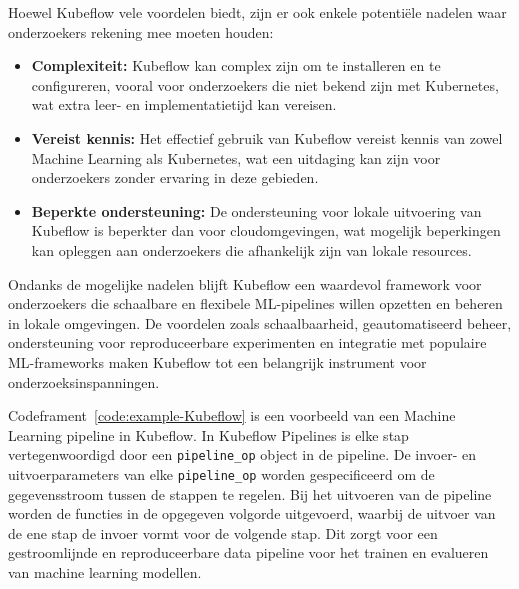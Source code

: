 Hoewel Kubeflow vele voordelen biedt, zijn er ook enkele potentiële nadelen waar onderzoekers rekening mee moeten houden:
\begin{itemize}
    \item \textbf{Complexiteit:} Kubeflow kan complex zijn om te installeren en te configureren, vooral voor onderzoekers die niet bekend zijn met Kubernetes, wat extra leer- en implementatietijd kan vereisen.
    \item \textbf{Vereist kennis:} Het effectief gebruik van Kubeflow vereist kennis van zowel Machine Learning als Kubernetes, wat een uitdaging kan zijn voor onderzoekers zonder ervaring in deze gebieden.
    \item \textbf{Beperkte ondersteuning:} De ondersteuning voor lokale uitvoering van Kubeflow is beperkter dan voor cloudomgevingen, wat mogelijk beperkingen kan opleggen aan onderzoekers die afhankelijk zijn van lokale resources.
\end{itemize}
Ondanks de mogelijke nadelen blijft Kubeflow een waardevol framework voor onderzoekers die schaalbare en flexibele ML-pipelines willen opzetten en beheren in lokale omgevingen. De voordelen zoals schaalbaarheid, geautomatiseerd beheer, ondersteuning voor reproduceerbare experimenten en integratie met populaire ML-frameworks maken Kubeflow tot een belangrijk instrument voor onderzoeksinspanningen.

Codeframent~\ref{code:example-Kubeflow} is een voorbeeld van een Machine Learning pipeline in Kubeflow. In Kubeflow Pipelines is elke stap vertegenwoordigd door een \texttt{pipeline\_op} object in de pipeline. De invoer- en uitvoerparameters van elke \texttt{pipeline\_op} worden gespecificeerd om de gegevensstroom tussen de stappen te regelen. Bij het uitvoeren van de pipeline worden de functies in de opgegeven volgorde uitgevoerd, waarbij de uitvoer van de ene stap de invoer vormt voor de volgende stap. Dit zorgt voor een gestroomlijnde en reproduceerbare data pipeline voor het trainen en evalueren van machine learning modellen.

